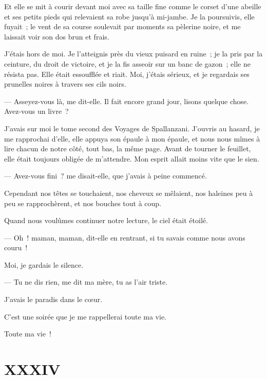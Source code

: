 \documentclass[french,twoside]{book} %
\begin{document}
Et elle se mit à courir devant moi avec sa taille fine comme le corset d’une abeille et ses petits pieds qui relevaient sa robe jusqu’à mi-jambe. Je la poursuivis, elle fuyait ; le vent de sa course soulevait par moments sa pèlerine noire, et me laissait voir son dos brun et frais.\par
J’étais hors de moi. Je l’atteignis près du vieux puisard en ruine ; je la pris par la ceinture, du droit de victoire, et je la fis asseoir sur un banc de gazon ; elle ne résista pas. Elle était essoufflée et riait. Moi, j’étais sérieux, et je regardais ses prunelles noires à travers ses cils noirs.\par
— Asseyez-vous là, me dit-elle. Il fait encore grand jour, lisons quelque chose. Avez-vous un livre ?\par
J’avais sur moi le tome second des Voyages de Spallanzani. J’ouvris au hasard, je me rapprochai d’elle, elle appuya son épaule à mon épaule, et nous nous mîmes à lire chacun de notre côté, tout bas, la même page. Avant de tourner le feuillet, elle était toujours obligée de m’attendre. Mon esprit allait moins vite que le sien.\par
— Avez-vous fini ? me disait-elle, que j’avais à peine commencé.\par
Cependant nos têtes se touchaient, nos cheveux se mêlaient, nos haleines peu à peu se rapprochèrent, et nos bouches tout à coup.\par
Quand nous voulûmes continuer notre lecture, le ciel était étoilé.\par
— Oh ! maman, maman, dit-elle en rentrant, si tu savais comme nous avons couru !\par
 Moi, je gardais le silence.\par
— Tu ne dis rien, me dit ma mère, tu as l’air triste.\par
J’avais le paradis dans le cœur.\par
C’est une soirée que je me rappellerai toute ma vie.\par
Toute ma vie !
 \section[{XXXIV}]{XXXIV}
\label{ch34}\renewcommand{\leftmark}{XXXIV}
\end{document}
